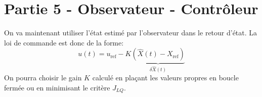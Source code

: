\documentclass[class=article, crop=false]{standalone}
\begin{document}
\section{Partie 5 - Observateur - Contrôleur}
On va maintenant utiliser l'état estimé par l'observateur dans le retour d'état. La loi de commande est donc de la forme:
\begin{equation}
    u(t) = u_{\text{ref}} - K \underbrace{(\hat{X}(t) - X_{\text{ref}})}_{\delta \hat{X}(t)}
\end{equation}
On pourra choisir le gain $K$ calculé en plaçant les valeurs propres en boucle fermée ou en minimisant le critère $J_{LQ}$.

\newpage
\end{document}
